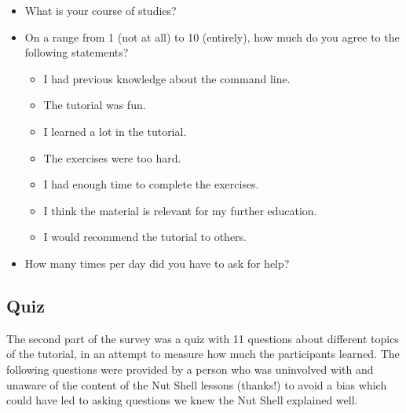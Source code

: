 \documentclass[twoside]{scrreprt}
\begin{document}
\begin{itemize}
    \item What is your course of studies?
    \item On a range from 1 (not at all) to 10 (entirely), how much do you agree to the following statements?
        \begin{itemize}
            \item I had previous knowledge about the command line.
            \item The tutorial was fun.
            \item I learned a lot in the tutorial.
            \item The exercises were too hard.
            \item I had enough time to complete the exercises.
            \item I think the material is relevant for my further education.
            \item I would recommend the tutorial to others.
        \end{itemize}
    \item How many times per day did you have to ask for help?
\end{itemize}

\subsection{Quiz}

The second part of the survey was a quiz with 11 questions about different topics of the tutorial, in an attempt to measure how much the participants learned. The following questions were provided by a person who was uninvolved with and unaware of the content of the Nut Shell lessons (thanks!) to avoid a bias which could have led to asking questions we knew the Nut Shell explained well.
\end{document}
